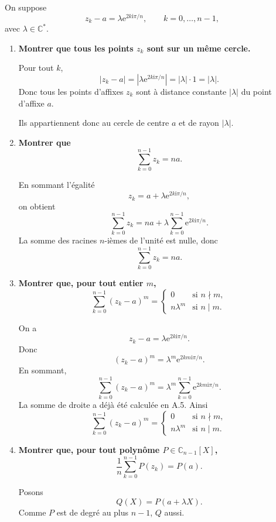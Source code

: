 \documentclass[11pt,a4paper]{article}
\newcommand{\C}{\mathbb{C}}
\newcommand{\ii}{\mathrm{i}}
\newcommand{\e}{\mathrm{e}}
\begin{document}
On suppose
\[
z_k-a=\lambda\e^{2k\ii\pi/n},
\qquad k=0,\dots,n-1,
\]
avec \(\lambda\in\C^\ast\).

\begin{enumerate}[label=\textbf{C.\arabic*.}]
    \item \textbf{Montrer que tous les points \(z_k\) sont sur un même cercle.}

    Pour tout \(k\),
    \[
    |z_k-a|=\left|\lambda\e^{2k\ii\pi/n}\right|=|\lambda|\cdot 1=|\lambda|.
    \]
    Donc tous les points d’affixes \(z_k\) sont à distance constante \(|\lambda|\) du point d’affixe \(a\).

    Ils appartiennent donc au cercle de centre \(a\) et de rayon \(|\lambda|\).

    \item \textbf{Montrer que
    \[
    \sum_{k=0}^{n-1}z_k=na.
    \]}

    En sommant l’égalité
    \[
    z_k=a+\lambda\e^{2k\ii\pi/n},
    \]
    on obtient
    \[
    \sum_{k=0}^{n-1}z_k
    =na+\lambda\sum_{k=0}^{n-1}\e^{2k\ii\pi/n}.
    \]
    La somme des racines \(n\)-ièmes de l’unité est nulle, donc
    \[
    \boxed{\sum_{k=0}^{n-1}z_k=na.}
    \]

    \item \textbf{Montrer que, pour tout entier \(m\),
    \[
    \sum_{k=0}^{n-1}(z_k-a)^m=
    \begin{cases}
    0 & \text{si } n\nmid m,\\
    n\lambda^m & \text{si } n\mid m.
    \end{cases}
    \]}

    On a
    \[
    z_k-a=\lambda\e^{2k\ii\pi/n}.
    \]
    Donc
    \[
    (z_k-a)^m=\lambda^m\e^{2km\ii\pi/n}.
    \]
    En sommant,
    \[
    \sum_{k=0}^{n-1}(z_k-a)^m
    =\lambda^m\sum_{k=0}^{n-1}\e^{2km\ii\pi/n}.
    \]
    La somme de droite a déjà été calculée en A.5. Ainsi
    \[
    \boxed{
    \sum_{k=0}^{n-1}(z_k-a)^m=
    \begin{cases}
    0 & \text{si } n\nmid m,\\
    n\lambda^m & \text{si } n\mid m.
    \end{cases}}
    \]

    \item \textbf{Montrer que, pour tout polynôme \(P\in\C_{n-1}[X]\),
    \[
    \frac1n\sum_{k=0}^{n-1}P(z_k)=P(a).
    \]}

    Posons
    \[
    Q(X)=P(a+\lambda X).
    \]
    Comme \(P\) est de degré au plus \(n-1\), \(Q\) aussi.


\end{enumerate}
\end{document}
